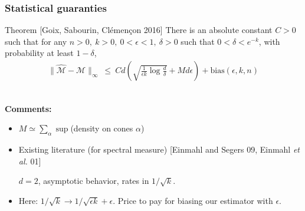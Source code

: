 \documentclass[9pt]{beamer}
\begin{document}
\begin{frame}
\frametitle{Statistical guaranties}

\begin{block}{Theorem {\small [Goix, Sabourin, Clémençon 2016]}}
There is an absolute constant $C > 0$ such that for any $n>0,~ k>0,~ 0<\epsilon<1,~ \delta>0$ such that $0<\delta<e^{-k}$, with probability at least $1 - \delta$,
\begin{align*}
\|\widehat{\mathcal{M}}- \mathcal{M}\|_\infty
~\le~  C d \left( \sqrt{ \frac{1}{\epsilon k}\log\frac{d}{\delta}} + M d\epsilon \right) + \text{bias}(\epsilon, k, n)
\end{align*}
\end{block}
~\\
\textbf{Comments:}
%
\begin{itemize}


\item $M \simeq \sum_\alpha \sup$(density on cones $\alpha$)


\item  Existing literature (for spectral measure) {\small [Einmahl and Segers 09, Einmahl \emph{et al.} 01]}

  \begin{center}
$d=2$, asymptotic behavior, rates  in $1/\sqrt k$.
  \end{center}
\item Here: $1/\sqrt k\to  1/\sqrt{\epsilon k} + \epsilon$. Price to pay
for biasing our estimator with $\epsilon$.
\end{itemize} 
\end{frame}
\end{document}
